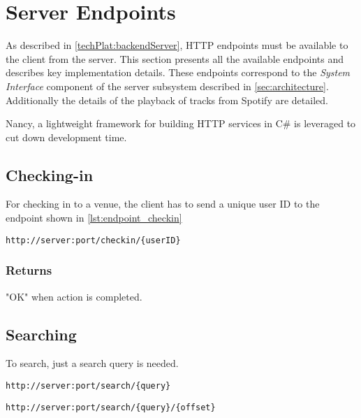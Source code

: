 \section{Server Endpoints}
\label{imp:backendServer}

As described in \cref{techPlat:backendServer}, HTTP endpoints must be
available to the client from the server. This section presents all the
available endpoints and describes key implementation
details. These endpoints correspond to the \emph{System Interface} component of the
server subsystem described in \cref{sec:architecture}. Additionally the details of the playback of tracks from
Spotify are detailed.

Nancy, a lightweight framework for building HTTP services in C\# is leveraged
to cut down development time.

\subsection{Checking-in}
For checking in to a venue, the client has to send a unique user ID to
the endpoint shown in \cref{lst:endpoint_checkin}

\begin{lstlisting}[label={lst:endpoint_checkin}, caption={HTTP endpoint allowing client to check-in to a venue. Text surrounded by curly brackets are parameters.}]
http://server:port/checkin/{userID}
\end{lstlisting}

\subsubsection{Returns}
"OK" when action is completed.

\subsection{Searching}
To search, just a search query is needed.

\begin{lstlisting}[label={lst:endpoint_search}, caption={Text surrounded by curly brackets are parameters.}]
http://server:port/search/{query}
\end{lstlisting}

\begin{lstlisting}[label={lst:endpoint_search_offset}, caption={Text surrounded by curly brackets are parameters.}]
http://server:port/search/{query}/{offset}
\end{lstlisting}

